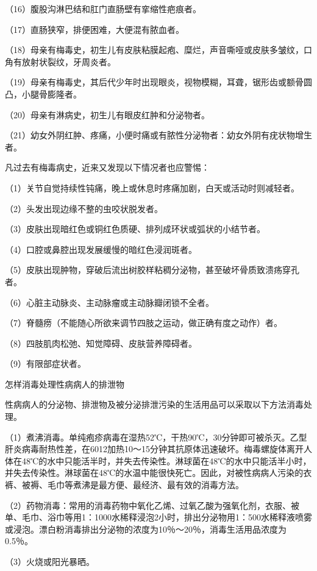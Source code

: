\documentclass[12pt,UTF8]{ctexbook}
\begin{document}
（16）腹股沟淋巴结和肛门直肠壁有挛缩性疤痕者。

（17）直肠狭窄，排便困难，大便混有脓血者。

（18）母亲有梅毒史，初生儿有皮肤粘膜起疱、糜烂，声音嘶哑或皮肤多皱纹，口角有放射状裂纹，牙周炎者。

（19）母亲有梅毒史，其后代少年时出现眼炎，视物模糊，耳聋，锯形齿或额骨圆凸，小腿骨膨隆者。

（20）母亲有淋病史，初生儿有眼皮红肿和分泌物者。

（21）幼女外阴红肿、疼痛，小便时痛或有脓性分泌物者：幼女外阴有疣状物增生者。

凡过去有梅毒病史，近来又发现以下情况者也应警惕：

（1）关节自觉持续性钝痛，晚上或休息时疼痛加剧，白天或活动时则减轻者。

（2）头发出现边缘不整的虫咬状脱发者。

（3）皮肤出现暗红色或铜红色质硬、排列成环状或弧状的小结节者。

（4）口腔或鼻腔出现发展缓慢的暗红色浸润斑者。

（5）皮肤出现肿物，穿破后流出树胶样粘稠分泌物，甚至破坏骨质致溃疡穿孔者。

（6）心脏主动脉炎、主动脉瘤或主动脉瓣闭锁不全者。

（7）脊髓痨（不能随心所欲来调节四肢之运动，做正确有度之动作）者。

（8）四肢肌肉松弛、知觉障碍、皮肤营养障碍者。

（9）有限部症状者。





怎样消毒处理性病病人的排泄物


性病病人的分泌物、排泄物及被分泌排泄污染的生活用品可以采取以下方法消毒处理。

（1）煮沸消毒。单纯疱疹病毒在湿热52℃，干热90℃，30分钟即可被杀灭。乙型肝炎病毒耐热性差，在6012加热10～15分钟其抗原体迅速破坏。梅毒螺旋体离开人体在48℃的水中只能活半时，并失去传染性。淋球菌在48℃的水中只能活半小时，并失去传染性。淋球菌在48℃的水温中能很快死亡。因此，对被性病病人污染的衣裤、被褥、毛巾等煮沸是最方便、最经济、最有效的消毒方法。

（2）药物消毒：常用的消毒药物中氧化乙烯、过氧乙酸为强氧化剂，衣服、被单、毛巾、浴巾等用1：1000水稀释浸泡2小时，排出分泌物用1：500水稀释液喷雾或浸泡。漂白粉消毒排出分泌物的浓度为10％～20％，消毒生活用品浓度为0.5％。

（3）火烧或阳光暴晒。
\end{document}
